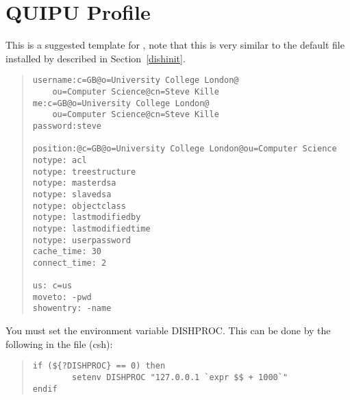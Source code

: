 \section {QUIPU Profile}
\label {profile}
This is a suggested template for , note that this is very
similar to the default file installed by  described in
Section~\ref{dishinit}.


\begin{quote}\small\begin{verbatim}
username:c=GB@o=University College London@
    ou=Computer Science@cn=Steve Kille
me:c=GB@o=University College London@
    ou=Computer Science@cn=Steve Kille
password:steve

position:@c=GB@o=University College London@ou=Computer Science
notype: acl
notype: treestructure
notype: masterdsa
notype: slavedsa
notype: objectclass
notype: lastmodifiedby
notype: lastmodifiedtime
notype: userpassword
cache_time: 30
connect_time: 2

us: c=us
moveto: -pwd
showentry: -name

\end{verbatim}\end{quote}

You must set the environment variable DISHPROC.  This can be done by the
following in the  file (csh):

\begin{quote}\begin{verbatim}
if (${?DISHPROC} == 0) then
        setenv DISHPROC "127.0.0.1 `expr $$ + 1000`"
endif
\end{verbatim}\end{quote}


